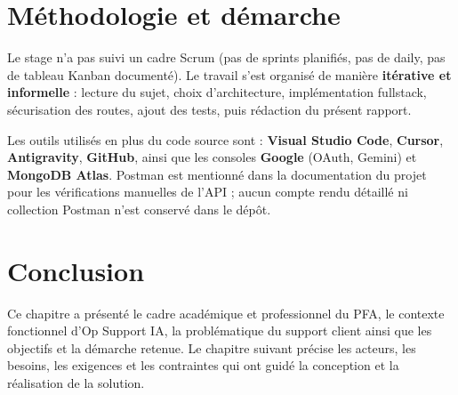 \section{Méthodologie et démarche}

Le stage n'a pas suivi un cadre Scrum (pas de sprints planifiés, pas de daily, pas de tableau Kanban documenté). Le travail s'est organisé de manière \textbf{itérative et informelle} : lecture du sujet, choix d'architecture, implémentation fullstack, sécurisation des routes, ajout des tests, puis rédaction du présent rapport.

Les outils utilisés en plus du code source sont : \textbf{Visual Studio Code}, \textbf{Cursor}, \textbf{Antigravity}, \textbf{GitHub}, ainsi que les consoles \textbf{Google} (OAuth, Gemini) et \textbf{MongoDB Atlas}. Postman est mentionné dans la documentation du projet pour les vérifications manuelles de l'API ; aucun compte rendu détaillé ni collection Postman n'est conservé dans le dépôt.

\section{Conclusion}

Ce chapitre a présenté le cadre académique et professionnel du PFA, le contexte fonctionnel d'Op Support IA, la problématique du support client ainsi que les objectifs et la démarche retenue. Le chapitre suivant précise les acteurs, les besoins, les exigences et les contraintes qui ont guidé la conception et la réalisation de la solution.
